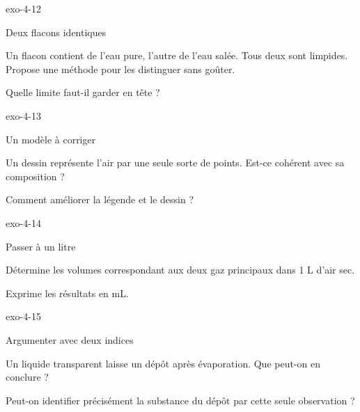\documentclass[12pt,twoside,openany]{book}
\begin{document}
\begin{blocLivre}{exo-4-12}
\begin{exercice}[3]{Deux flacons identiques}
\begin{questions}
\item Un flacon contient de l’eau pure, l’autre de l’eau salée. Tous deux sont limpides. Propose une méthode pour les distinguer sans goûter.
\item Quelle limite faut-il garder en tête ?
\end{questions}
\end{exercice}\end{blocLivre}
\begin{blocLivre}{exo-4-13}
\begin{exercice}[3]{Un modèle à corriger}
\begin{questions}
\item Un dessin représente l’air par une seule sorte de points. Est-ce cohérent avec sa composition ?
\item Comment améliorer la légende et le dessin ?
\end{questions}
\end{exercice}\end{blocLivre}
\begin{blocLivre}{exo-4-14}
\begin{exercice}[3]{Passer à un litre}
\begin{questions}
\item Détermine les volumes correspondant aux deux gaz principaux dans 1 L d’air sec.
\item Exprime les résultats en mL.
\end{questions}
\end{exercice}\end{blocLivre}
\begin{blocLivre}{exo-4-15}
\begin{exercice}[3]{Argumenter avec deux indices}
\begin{questions}
\item Un liquide transparent laisse un dépôt après évaporation. Que peut-on en conclure ?
\item Peut-on identifier précisément la substance du dépôt par cette seule observation ?
\end{questions}
\end{exercice}\end{blocLivre}
\end{document}
